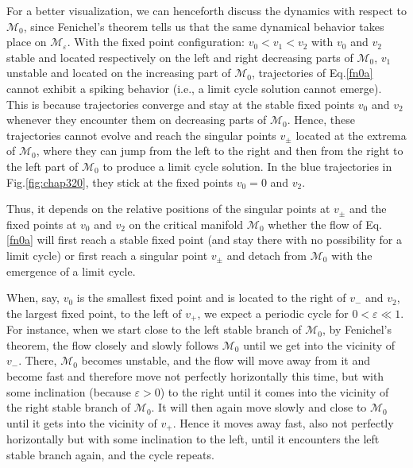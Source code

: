 For a better visualization,  we can  henceforth
discuss  the dynamics with respect to $\mathcal{M}_0$, since  Fenichel's theorem tells us that the same dynamical 
behavior takes place on $\mathcal{M}_{\varepsilon}$.
With the fixed point configuration: $v_0<v_1<v_2$ with $v_0$ and $v_2$ stable and  
located respectively on the left and right decreasing parts of  $\mathcal{M}_0$, $v_1$ unstable and located on the increasing part of $\mathcal{M}_0$,
trajectories of
Eq.\eqref{fn0a} cannot exhibit a spiking behavior (i.e., a limit cycle solution cannot emerge). This is because trajectories converge and stay at 
the stable fixed points $v_0$ and $v_2$ whenever they encounter them on 
decreasing parts of $\mathcal{M}_{0}$. Hence, these trajectories cannot evolve and reach the singular points $v_{\pm}$ located at the extrema of $\mathcal{M}_{0}$,
where they can jump from the left to the right and then from the right to the left part of  $\mathcal{M}_{0}$ 
to produce a limit cycle solution. In the blue trajectories in Fig.\ref{fig:chap320}, they stick at the fixed points $v_0=0$ and $v_2$.

Thus, it depends on the relative positions of the singular points at $v_\pm$ and the fixed
points at $v_0$ and $v_2$ on the critical manifold $\mathcal{M}_{0}$ whether the flow of Eq.\eqref{fn0a} will 
first reach a stable fixed point (and stay there with no possibility for a limit cycle) or 
first reach a singular point $v_{\pm}$ and detach from $\mathcal{M}_{0}$ with the emergence of a limit cycle.

When, say, $v_0$ is the smallest fixed point and is located to the
right of $v_-$ and $v_2$, the largest fixed point,  to the left of
$v_+$, we expect a periodic cycle for $0<\varepsilon\ll1$. For
instance, when we start close to the left stable branch of $\mathcal{M}_0$,
by Fenichel's theorem, the flow closely
and slowly follows $\mathcal{M}_0$ until we get into
the vicinity of $v_-$. There, $\mathcal{M}_0$ becomes unstable,
and the flow will move away from it and become fast and therefore
move not perfectly horizontally this time, but with some inclination (because $\varepsilon>0$) to the right until it comes into the
vicinity of the right stable branch of $\mathcal{M}_0$. It will
then again move slowly and close to $\mathcal{M}_0$ until it
gets into the vicinity of $v_+$. Hence it moves away fast, also not perfectly
horizontally but with some inclination to the left, until it encounters the left
stable branch again, and the cycle repeats.

